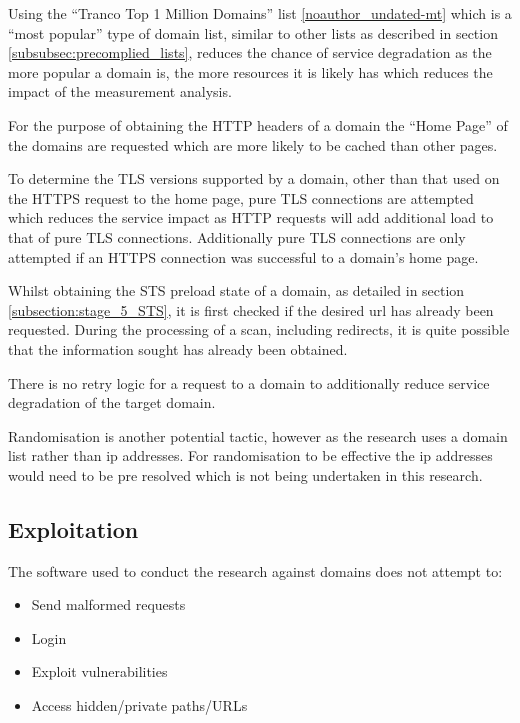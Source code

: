 \documentclass{mscreport}
\begin{document}
Using the ``Tranco Top 1 Million Domains'' list \ref{noauthor_undated-mt} which is a ``most popular'' type of domain list, similar to other lists as described in section \ref{subsubsec:precomplied_lists}, reduces the chance of service degradation as the more popular a domain is, the more resources it is likely has which reduces the impact of the measurement analysis.

\vspace{0.3cm} \noindent
For the purpose of obtaining the HTTP headers of a domain the ``Home Page'' of the domains are requested which are more likely to be cached than other pages.

\vspace{0.3cm} \noindent
To determine the TLS versions supported by a domain, other than that used on the HTTPS request to the home page, pure TLS connections are attempted which reduces the service impact as HTTP requests will add additional load to that of pure TLS connections. Additionally pure TLS connections are only attempted if an HTTPS connection was successful to a domain's home page.

\vspace{0.3cm} \noindent
Whilst obtaining the STS preload state of a domain, as detailed in section \ref{subsection:stage_5_STS}, it is first checked if the desired url has already been requested. During the processing of a scan, including redirects, it is quite possible that the information sought has already been obtained.

\vspace{0.3cm} \noindent
There is no retry logic for a request to a domain to additionally reduce service degradation of the target domain.

\vspace{0.3cm} \noindent
Randomisation is another potential tactic, however as the research uses a domain list rather than ip addresses. For randomisation to be effective the ip addresses would need to be pre resolved which is not being undertaken in this research.

\subsection{Exploitation}

The software used to conduct the research against domains does not attempt to:

\begin{itemize}
	\setlength\itemsep{0.1em}
    \item Send malformed requests
    \item Login
    \item Exploit vulnerabilities
    \item Access hidden/private paths/URLs
\end{itemize}
\end{document}
